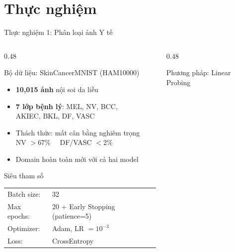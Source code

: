 \documentclass[aspectratio=169]{beamer}
\begin{document}
\section{Thực nghiệm}

\begin{frame}[t,shrink=15]{Thực nghiệm 1: Phân loại ảnh Y tế}
    \begin{columns}[t]
        \begin{column}{0.48\textwidth}
            \begin{block}{Bộ dữ liệu: SkinCancerMNIST (HAM10000)}
                \begin{itemize}
                    \item \textbf{10,015 ảnh} nội soi da liễu
                    \item \textbf{7 lớp bệnh lý}: MEL, NV, BCC,\\AKIEC, BKL, DF, VASC
                    \item Thách thức: \alert{mất cân bằng nghiêm trọng}\\
                          NV $>$67\% \ \ DF/VASC $<$2\%
                    \item Domain hoàn toàn mới với cả hai model
                \end{itemize}
            \end{block}
            \vspace{0.2cm}
            \begin{block}{Siêu tham số}
                \small
                \begin{tabular}{ll}
                    Batch size: & 32 \\
                    Max epochs: & 20 + Early Stopping (patience=5) \\
                    Optimizer: & Adam, LR $= 10^{-3}$ \\
                    Loss: & CrossEntropy \\
                \end{tabular}
            \end{block}
        \end{column}
        \begin{column}{0.48\textwidth}
            \begin{exampleblock}{Phương pháp: Linear Probing}

\end{exampleblock}
\end{column}
\end{columns}
\end{frame}
\end{document}
